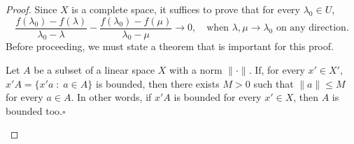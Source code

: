 \begin{proof}
    Since $X$ is a complete space, it suffices to prove that for every $\lambda_0 \in U$,
    \[ \frac{f(\lambda_0)-f(\lambda)}{\lambda_0 - \lambda} - \frac{f(\lambda_0)-f(\mu)}{\lambda_0 - \mu} \to 0,\quad \mbox{when $\lambda,\mu \to \lambda_0$ on any direction.} \]
    Before proceeding, we must state a theorem that is important for this proof.
    \begin{lemma}\label{lem:uniform_boundness_principle}
        Let $A$ be a subset of a linear space $X$ with a norm $\|\cdot\|$. If, for every $x'\in X'$, $x'A = \{x'a \;:\; a \in A\}$ is bounded, then there exists $M >0$ such that $\|a\| \leq M$ for every $a \in A$. In other words, if $x'A$ is bounded for every $x'\in X$, then $A$ is bounded too.\hfill $\square$
    \end{lemma}


\end{proof}
